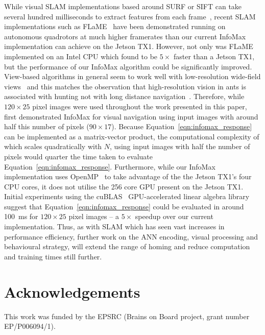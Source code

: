 \documentclass[letterpaper]{article}
\begin{document}
While visual SLAM implementations based around SURF or SIFT can take several hundred milliseconds to extract features from each frame~\citep{Bay2006}, recent SLAM implementations such as FLaME~\citep{Greene2017} have been demonstrated running on autonomous quadrotors at much higher framerates than our current InfoMax implementation can achieve on the Jetson TX1.
However, not only was FLaME implemented on an Intel CPU which \citet{Biddulph2018} found to be $5\times$ faster than a Jetson TX1, but the performance of our InfoMax algorithm could be significantly improved.
View-based algorithms in general seem to work well with low-resolution wide-field views~\citep{Wystrach2016} and this matches the observation that high-resolution vision in ants is associated with hunting not with long distance navigation~\citep{Wystrach2016}.
Therefore, while $120 \times 25$ pixel images were used throughout the work presented in this paper, \citet{Baddeley2012} first demonstrated InfoMax for visual navigation using input images with around half this number of pixels ($90\times 17$).
Because Equation~\ref{eqn:infomax_response} can be implemented as a matrix-vector product, the computational complexity of which scales quadratically with $N$, using input images with half the number of pixels would quarter the time taken to evaluate Equation~\ref{eqn:infomax_response}. 
Furthermore, while our InfoMax implementation uses OpenMP~\citep{Dagum1998} to take advantage of the the Jetson TX1's four CPU cores, it does not utilise the \num{256} core GPU present on the Jetson TX1. 
Initial experiments using the cuBLAS~\citep{NVIDIACorporation2007} GPU-accelerated linear algebra library suggest that Equation~\ref{eqn:infomax_response} could be evaluated in around \SI{100}{\milli\second} for $120 \times 25$ pixel images -- a $5 \times$ speedup over our current implementation.
Thus, as with SLAM which has seen vast increases in performance efficiency, further work on the ANN encoding, visual processing and behavioural strategy, will extend the range of homing and reduce computation and training times still further.

\section{Acknowledgements}
This work was funded by the EPSRC (Brains on Board project, grant number EP/P006094/1).

\scriptsize

\end{document}
